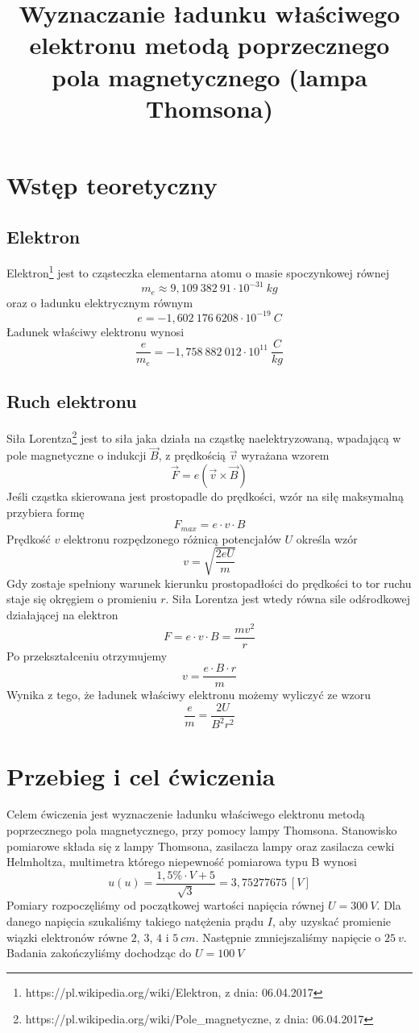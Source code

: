 \documentclass{article}
\begin{document}
\title{\huge\bfseries Wyznaczanie ładunku właściwego elektronu metodą
poprzecznego pola magnetycznego (lampa Thomsona)}
\date{}
\author{}
\maketitle
\section{Wstęp teoretyczny}
\subsection{Elektron}
Elektron\footnote[1]{https://pl.wikipedia.org/wiki/Elektron, z dnia: 06.04.2017} jest to cząsteczka elementarna atomu o masie spoczynkowej równej
$$ m_e \approx 9,109\ 382\ 91 \cdot 10^{-31}\ kg$$
oraz o ładunku elektrycznym równym 
$$ e = -1,602\ 176\ 6208 \cdot 10^{-19}\ C$$
Ładunek właściwy elektronu wynosi
$$ \frac{e}{m_e} = -1,758\ 882\ 012 \cdot 10^{11}\ \frac{C}{kg}$$
\subsection{Ruch elektronu}
Siła Lorentza\footnote[2]{https://pl.wikipedia.org/wiki/Pole\_magnetyczne, z dnia: 06.04.2017} jest to siła jaka działa na cząstkę naelektryzowaną, wpadającą w pole magnetyczne o indukcji $\vec{B}$, z prędkością $\vec{v}$ wyrażana wzorem
$$\vec{F} = e(\vec{v} \times \vec{B})$$
Jeśli cząstka skierowana jest prostopadle do prędkości, wzór na siłę maksymalną przybiera formę
$$F_{max} = e \cdot v \cdot B$$
Prędkość $v$ elektronu rozpędzonego różnicą potencjałów $U$ określa wzór
$$v = \sqrt{\frac{2eU}{m}}$$
Gdy zostaje spełniony warunek kierunku prostopadłości do prędkości to tor ruchu staje się okręgiem o promieniu $r$. Siła Lorentza jest wtedy równa sile odśrodkowej działającej na elektron
$$F = e \cdot v \cdot B = \frac{mv^2}{r}$$
Po przekształceniu otrzymujemy 
$$v = \frac{ e \cdot B \cdot r}{m}$$
Wynika z tego, że ładunek właściwy elektronu możemy wyliczyć ze wzoru
$$\frac{e}{m} = \frac{2U}{B^2r^2}$$
\section{Przebieg i cel ćwiczenia}
Celem ćwiczenia jest wyznaczenie ładunku właściwego elektronu metodą poprzecznego pola magnetycznego, przy pomocy lampy Thomsona. Stanowisko pomiarowe składa się z lampy Thomsona, zasilacza lampy oraz zasilacza cewki Helmholtza, multimetra którego niepewność pomiarowa typu B wynosi
$$u(u) = \frac{1,5\% \cdot V + 5}{\sqrt{3}} = 3,75277675\ [V]$$
Pomiary rozpoczęliśmy od początkowej wartości napięcia równej $U = 300\ V$. Dla danego napięcia szukaliśmy takiego natężenia prądu $I$, aby uzyskać promienie wiązki elektronów równe $2$, $3$, $4$ i $5\ cm$. Następnie zmniejszaliśmy napięcie o $25\ v$. Badania zakończyliśmy dochodząc do $U = 100\ V$
\end{document}
